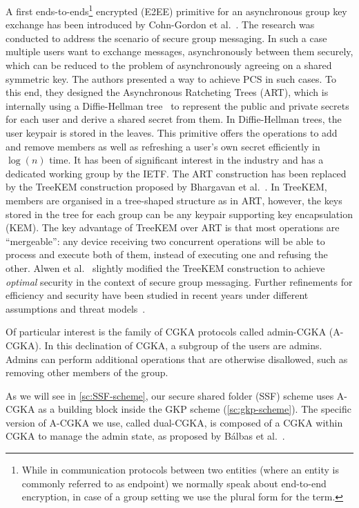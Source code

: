 A first ends-to-ends\footnote{While in communication protocols between two entities (where an entity is commonly referred to as endpoint) we normally speak about end-to-end encryption, in case of a group setting we use the plural form for the term.}
encrypted (E2EE) primitive for an asynchronous group key exchange 
has been introduced by Cohn-Gordon et al.~\cite{CCS:CCGMM18}. The research was conducted to address the scenario of secure group messaging.
In such a case multiple users want to exchange messages, asynchronously
between them securely, which can be reduced to the problem
of asynchronously agreeing on a shared symmetric key.
The authors presented a way to achieve PCS in such cases.
To this end, they designed the Asynchronous Ratcheting Trees (ART),
which is internally using a Diffie-Hellman tree~\cite{10.1145/1368310.1368347} 
to represent the public and private secrets for each user
and derive a shared secret from them. In Diffie-Hellman
trees, the user keypair is stored in the leaves.
This primitive offers the operations to add and remove members
as well as refreshing a user's own secret efficiently in $\log(n)$ time.
It has been of significant interest in the industry and
has a dedicated working group by the IETF.
The ART construction has been replaced by the TreeKEM
construction proposed by Bhargavan et al.~\cite{TreeKEM}.
In TreeKEM, members are organised in a tree-shaped structure
as in ART, however, the keys stored in the tree for each group
can be any keypair supporting key encapsulation (KEM).
The key advantage of TreeKEM over ART is that
most operations are ``mergeable'':
any device receiving two
concurrent operations will be able to process and execute both of them,
instead of executing one and refusing the other.
Alwen et al.~\cite{C:ACDT20} slightly modified the TreeKEM construction
to achieve \textit{optimal} security in the context of
secure group messaging.
Further refinements for efficiency and security have 
been studied in recent years under different assumptions and threat models~\cite{TCC:ACJM20, SP:KPWKCCMYAP21, CCS:ACDT21, CCS:AHKM22, EC:AANKPPW22, C:AlwJosMul22, C:AlwMulTse23, IWSPA:KEONO23}.

Of particular interest is the family of CGKA protocols called admin-CGKA (A-CGKA).
In this declination of CGKA, a subgroup of the users are admins. 
Admins can perform additional operations that are otherwise disallowed, such as removing other members of the group.

As we will see in \cref{sc:SSF-scheme}, our secure shared folder (SSF) scheme uses A-CGKA as a building block
inside the GKP scheme (\cref{sc:gkp-scheme}).
The specific version of A-CGKA we use, called dual-CGKA, is composed of a CGKA within CGKA to manage the admin state, as proposed by
B{\'a}lbas et al.\!~\cite{USENIX:BalColVau23}.

